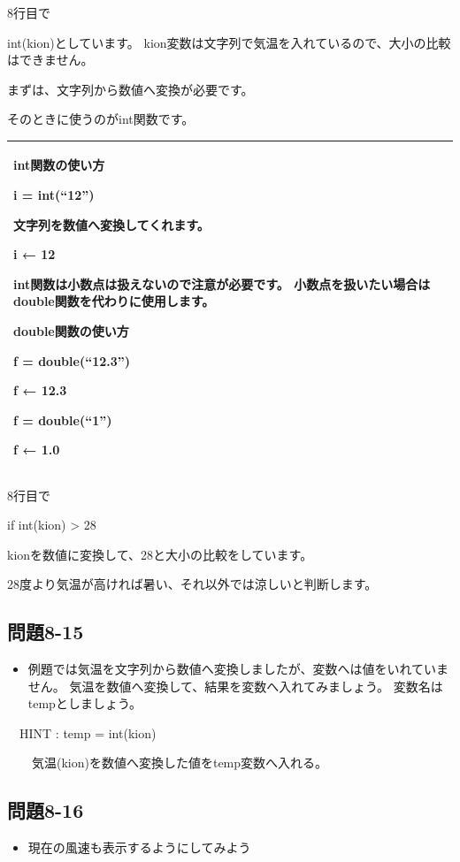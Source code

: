 \documentclass[a4paper,12pt,dvipdfmx]{jarticle}
\begin{document}
8行目で

int(kion)としています。
kion変数は文字列で気温を入れているので、大小の比較はできません。

まずは、文字列から数値へ変換が必要です。

そのときに使うのがint関数です。

\begin{center}
\tablefirsthead{}
\tablehead{}
\tabletail{}
\tablelasttail{}
\begin{supertabular}{|m{16.806cm}|}
\hline
int関数の使い方

i = int(“12”)

文字列を数値へ変換してくれます。

i ← 12 

int関数は小数点は扱えないので注意が必要です。
	小数点を扱いたい場合はdouble関数を代わりに使用します。

double関数の使い方

f = double(“12.3”)

f ← 12.3

f = double(“1”)

f ← 1.0\\\hline
\end{supertabular}
\end{center}

\bigskip

8行目で

if int(kion) {\textgreater} 28 

kionを数値に変換して、28と大小の比較をしています。

28度より気温が高ければ暑い、それ以外では涼しいと判断します。


\bigskip


\bigskip

\clearpage\subsection*{問題8-15}
\begin{itemize}
\item
例題では気温を文字列から数値へ変換しましたが、変数へは値をいれていません。
		気温を数値へ変換して、結果を変数へ入れてみましょう。
		変数名はtempとしましょう。
\end{itemize}
\ \ HINT : temp = int(kion)

\ \ \ \ 気温(kion)を数値へ変換した値をtemp変数へ入れる。

\subsection*{問題8-16}
\begin{itemize}
\item
現在の風速も表示するようにしてみよう
\end{itemize}
\end{document}

